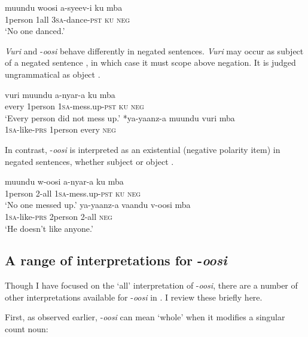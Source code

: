 \documentclass[output=paper]{langsci/langscibook}
\begin{document}
\ea\label{ex:landman:28}
\gll muundu   woosi  a-syeev-i    ku  mba\\
     1person\textsc{}    1all    3\textsc{sa}-dance-\textsc{pst}  \textsc{ku}  \textsc{neg} \\
\glt ‘No one danced.’
\z

  \textit{Vuri} and -\textit{oosi} behave differently in negated sentences. \textit{Vuri} may occur as subject of a negated sentence , in which case it must scope above negation. It is judged ungrammatical as object .

\ea\label{ex:landman:29} 
\ea\label{ex:landman:29a}
\gll vuri  muundu  a-nyar-a    ku  mba  \\
     every  1person  1\textsc{sa}-mess.up-\textsc{pst}  \textsc{ku}  \textsc{neg}\\
\glt ‘Every person did not mess up.’        
\ex\label{ex:landman:29b}
\gll \textup{*}ya-yaanz-a  muundu   vuri    mba \\
     1\textsc{sa}-like-\textsc{prs}  1person     every    \textsc{neg}\\
\z
\z

  In contrast, -\textit{oosi} is interpreted as an existential (negative polarity item) in negated sentences, whether subject  or object .

\ea\label{ex:landman:30} 
\ea\label{ex:landman:30a}
\gll muundu  w-oosi    a-nyar-a    ku  mba  \\
     1person  2-all    1\textsc{sa}-mess.up-\textsc{pst}  \textsc{ku  neg}\\
\glt ‘No one messed up.’        
\ex\label{ex:landman:30b}
\gll ya-yaanz-a  vaandu   v-oosi    mba \\
     1\textsc{sa}-like-\textsc{prs}  2person     2-all    \textsc{neg}\\
\glt ‘He doesn't like anyone.’
\z
\z

\subsection{A range of interpretations for -\textit{oosi}}\label{sec:landman:4.3}

Though I have focused on the ‘all’ interpretation of -\textit{oosi}, there are a number of other interpretations available for -\textit{oosi} in . I review these briefly here.

  First, as observed earlier, -\textit{oosi} can mean ‘whole’ when it modifies a singular count noun:
\end{document}
